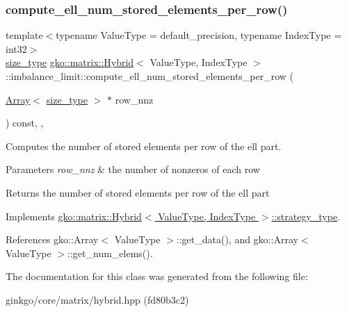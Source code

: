 \subsubsection{\texorpdfstring{compute\+\_\+ell\+\_\+num\+\_\+stored\+\_\+elements\+\_\+per\+\_\+row()}{compute\_ell\_num\_stored\_elements\_per\_row()}}
{\footnotesize\ttfamily template$<$typename Value\+Type = default\+\_\+precision, typename Index\+Type = int32$>$ \\
\hyperlink{namespacegko_a6e5c95df0ae4e47aab2f604a22d98ee7}{size\+\_\+type} \hyperlink{classgko_1_1matrix_1_1Hybrid}{gko\+::matrix\+::\+Hybrid}$<$ Value\+Type, Index\+Type $>$\+::imbalance\+\_\+limit\+::compute\+\_\+ell\+\_\+num\+\_\+stored\+\_\+elements\+\_\+per\+\_\+row (\begin{DoxyParamCaption}\item[{\hyperlink{classgko_1_1Array}{Array}$<$ \hyperlink{namespacegko_a6e5c95df0ae4e47aab2f604a22d98ee7}{size\+\_\+type} $>$ $\ast$}]{row\+\_\+nnz }\end{DoxyParamCaption}) const\hspace{0.3cm}{\ttfamily [inline]}, {\ttfamily [override]}, {\ttfamily [virtual]}}



Computes the number of stored elements per row of the ell part. 


\begin{DoxyParams}{Parameters}
{\em row\+\_\+nnz} & the number of nonzeros of each row\\
\hline
\end{DoxyParams}
\begin{DoxyReturn}{Returns}
the number of stored elements per row of the ell part 
\end{DoxyReturn}


Implements \hyperlink{classgko_1_1matrix_1_1Hybrid_1_1strategy__type_a0a0cd4024f27c7d0f286f35fc0a6de60}{gko\+::matrix\+::\+Hybrid$<$ Value\+Type, Index\+Type $>$\+::strategy\+\_\+type}.



References gko\+::\+Array$<$ Value\+Type $>$\+::get\+\_\+data(), and gko\+::\+Array$<$ Value\+Type $>$\+::get\+\_\+num\+\_\+elems().



The documentation for this class was generated from the following file\+:\begin{DoxyCompactItemize}
\item 
ginkgo/core/matrix/hybrid.\+hpp (fd80b3c2)\end{DoxyCompactItemize}
